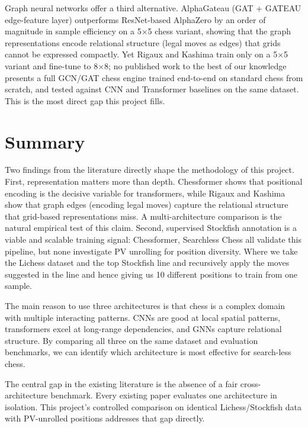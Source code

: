Graph neural networks offer a third alternative. AlphaGateau \cite{gnn_chess} (GAT + GATEAU edge-feature layer) outperforms ResNet-based AlphaZero by an order of magnitude in sample efficiency on a 5$\times$5 chess variant, showing that the graph representations encode relational structure (legal moves as edges) that grids cannot be expressed compactly. Yet Rigaux and Kashima \cite{gnn_chess} train only on a 5$\times$5 variant and fine-tune to 8$\times$8; no published work to the best of our knowledge presents a full GCN/GAT chess engine trained end-to-end on standard chess from scratch, and tested against CNN and Transformer baselines on the same dataset. This is the most direct gap this project fills.

\section{Summary}

Two findings from the literature directly shape the methodology of this project. First, representation matters more than depth. Chessformer \cite{chessformer} shows that positional encoding is the decisive variable for transformers, while Rigaux and Kashima \cite{gnn_chess} show that graph edges (encoding legal moves) capture the relational structure that grid-based representations miss. A multi-architecture comparison is the natural empirical test of this claim. Second, supervised Stockfish annotation is a viable and scalable training signal: Chessformer, Searchless Chess \cite{searchless_chess} all validate this pipeline, but none investigate PV unrolling for position diversity. Where we take the Lichess dataset and the top Stockfish line and recursively apply the moves suggested in the line and hence giving us 10 different positions to train from one sample.

The main reason to use three architectures is that chess is a complex domain with multiple interacting patterns. CNNs are good at local spatial patterns, transformers excel at long-range dependencies, and GNNs capture relational structure. By comparing all three on the same dataset and evaluation benchmarks, we can identify which architecture is most effective for search-less chess.

The central gap in the existing literature is the absence of a fair cross-architecture benchmark. Every existing paper evaluates one architecture in isolation. This project's controlled comparison on identical Lichess/Stockfish data with PV-unrolled positions addresses that gap directly.
